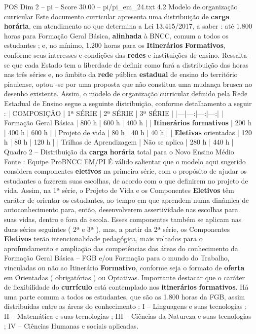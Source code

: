 \begin{textsample}{POS Dim 2 – pi – Score 30.00 – pi/pi\_em\_24.txt}  \label{ex:f2_pos_095}
4.2 Modelo de organização curricular Este documento curricular apresenta uma distribuição de \textbf{carga} \textbf{horária}, em atendimento ao que determina a Lei 13.415/2017, a saber : até 1.800 horas para Formação Geral Básica, \textbf{alinhada} à BNCC, comum a todos os estudantes ; e, no mínimo, 1.200 horas para os \textbf{Itinerários} \textbf{Formativos}, conforme seus interesses e condições das \textbf{redes} e instituições de ensino.
Ressalta -se que cada Estado tem a liberdade de definir como fará a distribuição das horas nas três séries e, no âmbito da \textbf{rede} pública \textbf{estadual} de ensino do território piauiense, optou -se por uma proposta que não constitua uma mudança brusca no desenho existente.
Assim, o modelo de organização curricular definido pela Rede Estadual de Ensino segue a seguinte distribuição, conforme detalhamento a seguir : | COMPOSIÇÃO | 1ª SÉRIE | 2ª SÉRIE | 3ª SÉRIE | |---|---:|---:|---:| | Formação Geral Básica | 800 h | 600 h | 400 h | | \textbf{Itinerários} \textbf{formativos} | 200 h | 400 h | 600 h | | Projeto de vida | 80 h | 40 h | 40 h | | \textbf{Eletivas} orientadas | 120 h | 80 h | 120 h | | Trilhas de Aprendizagem | Não se aplica | 280 h | 440 h | Quadro 2 – Distribuição da \textbf{carga} \textbf{horária} total para o Novo Ensino Médio Fonte : Equipe ProBNCC EM/PI É válido salientar que o modelo aqui sugerido considera componentes \textbf{eletivos} na primeira série, com o propósito de ajudar os estudantes a fazerem suas escolhas, de acordo com o que definirem no projeto de vida.
Assim, na 1ª série, o Projeto de Vida e os Componentes \textbf{Eletivos} têm caráter de orientar os estudantes, ao tempo em que aprendem numa dinâmica de autoconhecimento para, então, desenvolverem assertividade nas escolhas para suas vidas, dentro e fora da escola.
Esses componentes também se aplicam nas duas séries seguintes ( 2ª e 3ª ), mas, a partir da 2ª série, os Componentes \textbf{Eletivos} terão intencionalidade pedagógica, mais voltados para o aprofundamento e ampliação das competências das áreas do conhecimento da Formação Geral Básica – FGB e/ou Formação para o mundo do Trabalho, vinculadas ou não ao Itinerário \textbf{Formativo}, conforme seja o formato de \textbf{oferta} em Orientadas ( obrigatórias ) ou Optativas.
Importante destacar que o caráter de flexibilidade do \textbf{currículo} está contemplado nos \textbf{itinerários} \textbf{formativos}.
Há uma parte comum a todos os estudantes, que são as 1.800 horas da FGB, assim distribuídas entre as áreas do conhecimento : I – Linguagens e suas tecnologias ; II – Matemática e suas tecnologias ; III – Ciências da Natureza e suas tecnologias ; IV – Ciências Humanas e sociais aplicadas.

\end{textsample}
